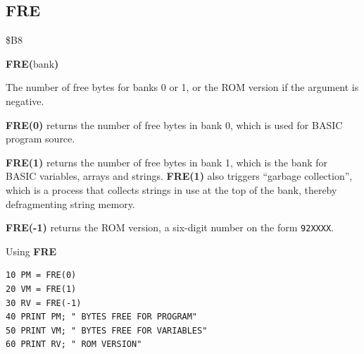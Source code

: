 
\newpage
\subsection{FRE}
\begin{description}[leftmargin=2cm,style=nextline]
\item [Token:]    \$B8
\item [Format:]   {\bf FRE(}bank{\bf)}
\item [Returns:]  The number of free bytes for banks 0 or 1, or the ROM version if the argument is negative.

                  {\bf FRE(0)} returns the number of free bytes in bank 0, which is used for BASIC program source.

                  {\bf FRE(1)} returns the number of free bytes in bank 1, which is the bank for BASIC variables, arrays and strings. {\bf FRE(1)} also triggers ``garbage collection'', which is a process that collects strings in use at the top of the bank, thereby defragmenting string memory.

                  {\bf FRE(-1)} returns the ROM version, a six-digit number on the form \texttt{92XXXX}.

\item [Example:]  Using {\bf FRE}

\begin{tcolorbox}[colback=black,coltext=white]
\verbatimfont{\codefont}
\begin{verbatim}
10 PM = FRE(0)
20 VM = FRE(1)
30 RV = FRE(-1)
40 PRINT PM; " BYTES FREE FOR PROGRAM"
50 PRINT VM; " BYTES FREE FOR VARIABLES"
60 PRINT RV; " ROM VERSION"
\end{verbatim}
\end{tcolorbox}
\end{description}


\newpage
